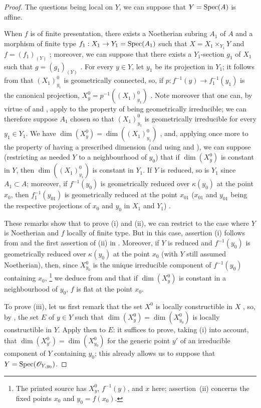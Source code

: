 \begin{proof}
The questions being local on $Y$, we can suppose that $Y=\operatorname{Spec}(A)$ is affine.

When $f$ is of finite presentation, there exists a Noetherian subring $A_1$ of $A$ and a morphism of finite type $f_1:X_1\to Y_1=\operatorname{Spec}(A_1)$ such that $X=X_1\times_{Y_1}Y$ and $f=(f_1)_{(Y)}$ ; moreover, we can suppose that there exists a $Y_1$-section $g_1$ of $X_1$ such that $g=(g_1)_{(Y)}$ .
For every $y\in Y$, let $y_1$ be its projection in $Y_1$; it follows from  that $(X_1)_{y_1}^0$ is geometrically connected, so, if $p:f^{-1}(y)\to f_1^{-1}(y_1)$ is the canonical projection, $X_y^0=p^{-1}((X_1)_{y_1}^0)$ .
Note moreover that one can, by virtue of  and , apply  to the property of being geometrically irreducible; we can therefore suppose $A_1$ chosen so that $(X_1)_{y_1}^0$ is geometrically irreducible for every $y_1\in Y_1$.
We have $\dim(X_y^0)=\dim((X_1)_{y_1}^0)$ , and, applying  once more to the property of having a prescribed dimension (and using  and ), we can suppose (restricting as needed $Y$ to a neighbourhood of $y_0$) that if $\dim(X_y^0)$ is constant in $Y$, then $\dim((X_1)_{y_1}^0)$ is constant in $Y_1$.
If $Y$ is reduced, so is $Y_1$ since $A_1\subset A$; moreover, if $f^{-1}(y_0)$ is geometrically reduced over $\kappa(y_0)$ at the point $x_0$, then $f_1^{-1}(y_{01})$ is geometrically reduced at the point $x_{01}$ ($x_{01}$ and $y_{01}$ being the respective projections of $x_0$ and $y_0$ in $X_1$ and $Y_1$) .

These remarks show that to prove (i) and (ii), we can restrict to the case where $Y$ is Noetherian and $f$ locally of finite type.
But in this case, assertion (i) follows from  and the first assertion of (ii) in .
Moreover, if $Y$ is reduced and $f^{-1}(y_0)$ is geometrically reduced over $\kappa(y_0)$ at the point $x_0$ (with $Y$ still assumed
Noetherian), then, since $X_{y_0}^0$ is the unique irreducible component of $f^{-1}(y_0)$ containing $x_0$,
\footnote{The printed source has $X_y^0$, $f^{-1}(y)$, and $x$ here; assertion~(ii) concerns the fixed points $x_0$ and $y_0=f(x_0)$.}
we deduce from  and  that if $\dim(X_y^0)$ is constant in a neighbourhood of $y_0$, $f$ is flat at the point $x_0$.

To prove (iii), let us first remark that the set $X^0$ is locally constructible in $X$ , so, by , the set $E$ of $y\in Y$ such that $\dim(X_y^0)=\dim(X_{y_0}^0)$ is locally constructible in $Y$.
Apply then  to $E$: it suffices to prove, taking (i) into account, that $\dim(X_{y'}^0)=\dim(X_{y_0}^0)$ for the generic point $y'$ of an irreducible component of $Y$ containing $y_0$; this already allows us to suppose that $Y=\operatorname{Spec}(\mathscr{O}_{Y,y_0})$.


\end{proof}
